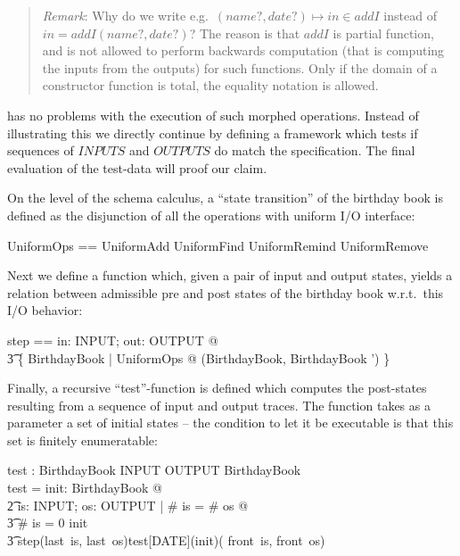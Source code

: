 \documentclass{article}
\newenvironment{remark}
{\begin{small}\begin{quote}\emph{Remark}: }{\end{quote}\end{small}}
\begin{document}
\begin{remark}
  Why do we write e.g.~$(name?,date?) \mapsto in \in addI$ instead of
  $in = addI(name?,date?)$? The reason is that $addI$ is partial
  function, and \ZAP{} is not allowed to perform backwards
  computation (that is computing the inputs from the outputs) 
  for such functions. Only if the domain of a constructor function
  is total, the equality notation is allowed.
\end{remark}

\ZAP{} has no problems with the execution of such morphed operations.
Instead of illustrating this we directly continue by defining a
framework which tests if sequences of $INPUTS$ and $OUTPUTS$ do match
the specification. The final evaluation of the test-data will proof
our claim.

On the level of the schema calculus, a ``state transition'' of the
birthday book is defined as the disjunction of all the 
operations with uniform I/O interface:

\begin{zed}
  UniformOps == UniformAdd \lor UniformFind \lor UniformRemind \lor UniformRemove
\end{zed}

Next we define a function which, given a pair of input and
output states, yields a relation between admissible pre and post states
of the birthday book w.r.t.~this I/O behavior:

\begin{axdef}
  step == \lambda in: INPUT; out: OUTPUT @ \\\t3
\{ \Delta BirthdayBook | UniformOps @ (\theta BirthdayBook, \theta BirthdayBook ') \}
\end{axdef}


Finally, a recursive ``test''-function is defined which computes the
post-states resulting from a sequence of input and output traces. The
function takes as a parameter a set of initial states -- the condition
to let it be executable is that this set is finitely enumeratable:

\begin{axdef}
  test : \power BirthdayBook \fun 
             \seq INPUT \cross \seq OUTPUT \fun  \power  BirthdayBook\\
\where
  test = \lambda  init: \power BirthdayBook @ \\\t2
          \lambda  is: \seq INPUT; os: \seq OUTPUT | \# is =  \# os @\\\t3
           \IF \# is = 0 \THEN init \\\t3
           \ELSE  step(last~is, last~os)\limg  test[DATE](init)( front~is, front~os) \rimg 
\end{axdef}
\end{document}
